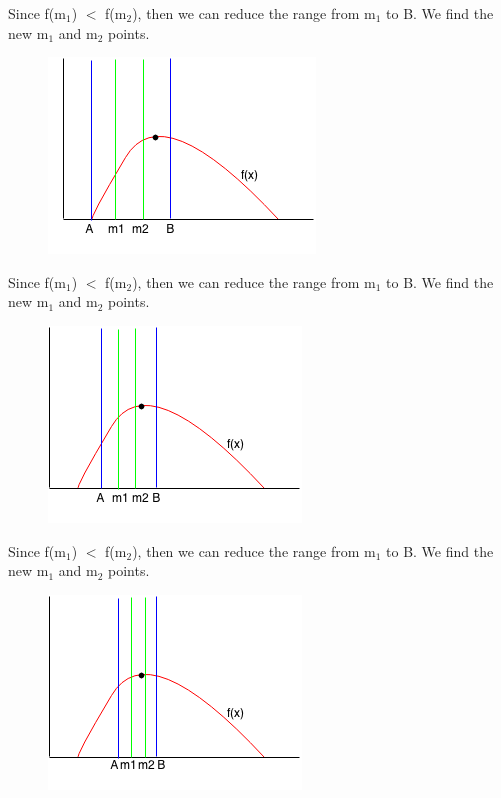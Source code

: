 \documentclass[11pt,oneside]{book}
\makeatletter
\def\maxwidth#1{\ifdim\Gin@nat@width>#1 #1\else\Gin@nat@width\fi}
\makeatother
\begin{document}
Since f(m$_{1}$) $<$ f(m$_{2}$), then we can reduce the range from m$_{1}$ to B. We find the new m$_{1}$ and m$_{2}$ points.

\vspace{5px}\begin{figure}[H]\centering
        \includegraphics[width=0.66\maxwidth{\textwidth}]{ternarysearch4.png}
        \end{figure}

Since f(m$_{1}$) $<$ f(m$_{2}$), then we can reduce the range from m$_{1}$ to B. We find the new m$_{1}$ and m$_{2}$ points.

\vspace{5px}\begin{figure}[H]\centering
        \includegraphics[width=0.66\maxwidth{\textwidth}]{ternarysearch5.png}
        \end{figure}

Since f(m$_{1}$) $<$ f(m$_{2}$), then we can reduce the range from m$_{1}$ to B. We find the new m$_{1}$ and m$_{2}$ points.

\vspace{5px}\begin{figure}[H]\centering
        \includegraphics[width=0.66\maxwidth{\textwidth}]{ternarysearch6.png}
        \end{figure}
\end{document}
